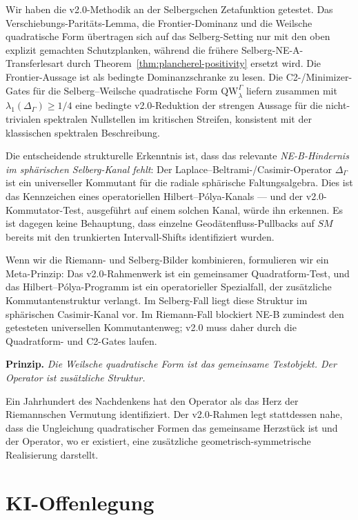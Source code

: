 \documentclass[12pt,a4paper]{article}
\theoremstyle{definition}
\theoremstyle{remark}
\newcommand{\QW}{\mathrm{QW}}
\newcommand{\Delop}{\Delta_{\Gamma}}
\begin{document}
Wir haben die v2.0-Methodik an der Selbergschen Zetafunktion getestet. Das
Verschiebungs-Paritäts-Lemma, die Frontier-Dominanz und die Weilsche quadratische Form
übertragen sich auf das Selberg-Setting nur mit den oben explizit gemachten
Schutzplanken, während die frühere Selberg-NE-A-Transferlesart durch
Theorem~\ref{thm:plancherel-positivity} ersetzt wird. Die Frontier-Aussage ist
als bedingte Dominanzschranke zu lesen. Die C2-/Minimizer-Gates für die
Selberg--Weilsche quadratische Form $\QW^\Gamma_\lambda$ liefern zusammen mit
$\lambda_1(\Delop)\ge 1/4$ eine bedingte v2.0-Reduktion der strengen Aussage
für die nicht-trivialen spektralen Nullstellen im kritischen Streifen,
konsistent mit der klassischen spektralen Beschreibung.

Die entscheidende strukturelle Erkenntnis ist, dass das relevante
\emph{NE-B-Hindernis im sphärischen Selberg-Kanal fehlt}: Der
Laplace--Beltrami-/Casimir-Operator $\Delop$ ist ein universeller Kommutant
für die radiale sphärische Faltungsalgebra. Dies ist das Kennzeichen eines
operatoriellen Hilbert--Pólya-Kanals --- und der v2.0-Kommutator-Test,
ausgeführt auf einem solchen Kanal, würde ihn erkennen. Es ist dagegen keine
Behauptung, dass einzelne Geodätenfluss-Pullbacks auf $SM$ bereits mit den
trunkierten Intervall-Shifts identifiziert wurden.

Wenn wir die Riemann- und Selberg-Bilder kombinieren, formulieren wir ein Meta-Prinzip:
Das v2.0-Rahmenwerk ist ein gemeinsamer Quadratform-Test, und das
Hilbert--Pólya-Programm ist ein operatorieller Spezialfall, der zusätzliche
Kommutantenstruktur verlangt. Im Selberg-Fall liegt diese Struktur im
sphärischen Casimir-Kanal vor. Im Riemann-Fall blockiert NE-B zumindest den
getesteten universellen Kommutantenweg; v2.0 muss daher durch die Quadratform-
und C2-Gates laufen.

\medskip
\noindent\textbf{Prinzip.} \emph{Die Weilsche quadratische Form ist das
gemeinsame Testobjekt. Der Operator ist zusätzliche Struktur.}

\medskip
Ein Jahrhundert des Nachdenkens hat den Operator als das Herz der
Riemannschen Vermutung identifiziert. Der v2.0-Rahmen legt stattdessen nahe,
dass die Ungleichung quadratischer Formen das gemeinsame Herzstück ist und der
Operator, wo er existiert, eine zusätzliche geometrisch-symmetrische
Realisierung darstellt.


\section*{KI-Offenlegung}
\end{document}
